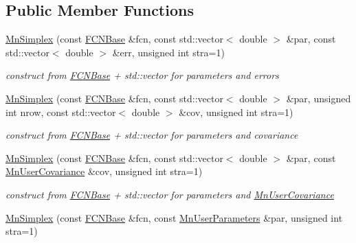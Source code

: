 \subsection*{Public Member Functions}
\begin{DoxyCompactItemize}
\item 
\mbox{\hyperlink{classROOT_1_1Minuit2_1_1MnSimplex_abc4ddf29140ab0ada1e90afbc33359cf}{Mn\+Simplex}} (const \mbox{\hyperlink{classROOT_1_1Minuit2_1_1FCNBase}{F\+C\+N\+Base}} \&fcn, const std\+::vector$<$ double $>$ \&par, const std\+::vector$<$ double $>$ \&err, unsigned int stra=1)
\begin{DoxyCompactList}\small\item\em construct from \mbox{\hyperlink{classROOT_1_1Minuit2_1_1FCNBase}{F\+C\+N\+Base}} + std\+::vector for parameters and errors \end{DoxyCompactList}\item 
\mbox{\hyperlink{classROOT_1_1Minuit2_1_1MnSimplex_a7c7c4c6af82a37f75f574e80db9b4d08}{Mn\+Simplex}} (const \mbox{\hyperlink{classROOT_1_1Minuit2_1_1FCNBase}{F\+C\+N\+Base}} \&fcn, const std\+::vector$<$ double $>$ \&par, unsigned int nrow, const std\+::vector$<$ double $>$ \&cov, unsigned int stra=1)
\begin{DoxyCompactList}\small\item\em construct from \mbox{\hyperlink{classROOT_1_1Minuit2_1_1FCNBase}{F\+C\+N\+Base}} + std\+::vector for parameters and covariance \end{DoxyCompactList}\item 
\mbox{\hyperlink{classROOT_1_1Minuit2_1_1MnSimplex_ab97366c72fb0ab991cfcdaa6fb8dcb01}{Mn\+Simplex}} (const \mbox{\hyperlink{classROOT_1_1Minuit2_1_1FCNBase}{F\+C\+N\+Base}} \&fcn, const std\+::vector$<$ double $>$ \&par, const \mbox{\hyperlink{classROOT_1_1Minuit2_1_1MnUserCovariance}{Mn\+User\+Covariance}} \&cov, unsigned int stra=1)
\begin{DoxyCompactList}\small\item\em construct from \mbox{\hyperlink{classROOT_1_1Minuit2_1_1FCNBase}{F\+C\+N\+Base}} + std\+::vector for parameters and \mbox{\hyperlink{classROOT_1_1Minuit2_1_1MnUserCovariance}{Mn\+User\+Covariance}} \end{DoxyCompactList}\item 
\mbox{\hyperlink{classROOT_1_1Minuit2_1_1MnSimplex_ae306bac9f00c5b8d330ca4166620f75e}{Mn\+Simplex}} (const \mbox{\hyperlink{classROOT_1_1Minuit2_1_1FCNBase}{F\+C\+N\+Base}} \&fcn, const \mbox{\hyperlink{classROOT_1_1Minuit2_1_1MnUserParameters}{Mn\+User\+Parameters}} \&par, unsigned int stra=1)

\end{DoxyCompactItemize}
